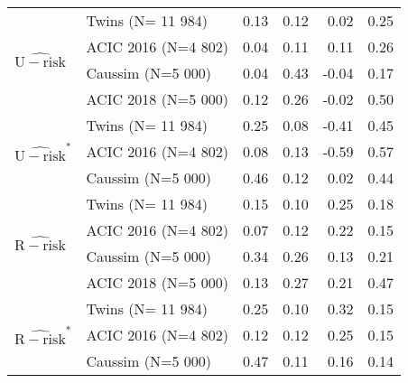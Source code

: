 \begin{tabular}{llrrrr}
\cline{1-6} \cline{2-6}
\multirow[c]{4}{*}{$\widehat{\mathrm{U-risk}}$} & Twins 
 (N= 11 984) & 0.13 & 0.12 & 0.02 & 0.25 \\
\cline{2-6}
 & ACIC 2016
 (N=4 802) & 0.04 & 0.11 & 0.11 & 0.26 \\
\cline{2-6}
 & Caussim
 (N=5 000) & 0.04 & 0.43 & -0.04 & 0.17 \\
\cline{2-6}
 & ACIC 2018 
 (N=5 000) & 0.12 & 0.26 & -0.02 & 0.50 \\
\cline{1-6} \cline{2-6}
\multirow[c]{3}{*}{$\widehat{\mathrm{U-risk}}^{*}$} & Twins 
 (N= 11 984) & 0.25 & 0.08 & -0.41 & 0.45 \\
\cline{2-6}
 & ACIC 2016
 (N=4 802) & 0.08 & 0.13 & -0.59 & 0.57 \\
\cline{2-6}
 & Caussim
 (N=5 000) & 0.46 & 0.12 & 0.02 & 0.44 \\
\cline{1-6} \cline{2-6}
\multirow[c]{4}{*}{$\widehat{\mathrm{R-risk}}$} & Twins 
 (N= 11 984) & 0.15 & 0.10 & 0.25 & 0.18 \\
\cline{2-6}
 & ACIC 2016
 (N=4 802) & 0.07 & 0.12 & 0.22 & 0.15 \\
\cline{2-6}
 & Caussim
 (N=5 000) & 0.34 & 0.26 & 0.13 & 0.21 \\
\cline{2-6}
 & ACIC 2018 
 (N=5 000) & 0.13 & 0.27 & 0.21 & 0.47 \\
\cline{1-6} \cline{2-6}
\multirow[c]{3}{*}{$\widehat{\mathrm{R-risk}}^{*}$} & Twins 
 (N= 11 984) & 0.25 & 0.10 & 0.32 & 0.15 \\
\cline{2-6}
 & ACIC 2016
 (N=4 802) & 0.12 & 0.12 & 0.25 & 0.15 \\
\cline{2-6}
 & Caussim
 (N=5 000) & 0.47 & 0.11 & 0.16 & 0.14 \\
\cline{1-6} \cline{2-6}
\bottomrule
\end{tabular}
